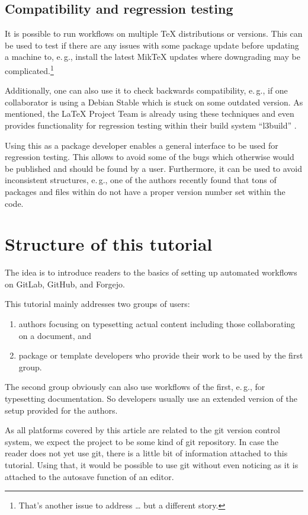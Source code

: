 \documentclass[final]{ltugboat}
\newcommand*{\TeXLive}{\acro{\TeX\,Live}\xspace}
\begin{document}
\subsection{Compatibility and regression testing}
It is possible to run workflows on multiple \TeX{} distributions or versions.
This can be used to test if there are any issues with some package update before updating a machine to, e.\,g., install the latest MikTeX updates where downgrading may be complicated.\footnote{That's another issue to address … but a different story.}

Additionally, one can also use it to check backwards compatibility, e.\,g., if one collaborator is using a Debian Stable which is stuck on some outdated version.
As mentioned, the \LaTeX{} Project Team is already using these techniques and even provides functionality for regression testing within their build system \enquote{l3build} \cite{l3build}.

Using this as a package developer enables a general interface to be used for regression testing.
This allows to avoid some of the bugs which otherwise would be published and should be found by a user.
Furthermore, it can be used to avoid inconsistent structures, e.\,g., one of the authors recently found that tons of packages and files within \TeXLive{} do not have a proper version number set within the code.

\section{Structure of this tutorial}

The idea is to introduce readers to the basics of setting up automated workflows on GitLab, GitHub, and Forgejo.

This tutorial mainly addresses two groups of users:

\begin{enumerate}
\item authors focusing on typesetting actual content including those collaborating on a document, and
\item package or template developers who provide their work to be used by the first group.
\end{enumerate}

The second group obviously can also  use workflows of the first, e.\,g., for typesetting documentation.
So developers usually use an extended version of the setup provided for the authors.

As all platforms covered by this article are related to the git version control system, we expect the project to be some kind of git repository.
In case the reader does not yet use git, there is a little bit of information attached to this tutorial.
Using that, it would be possible to use git without even noticing as it is attached to the autosave function of an editor.
\end{document}
